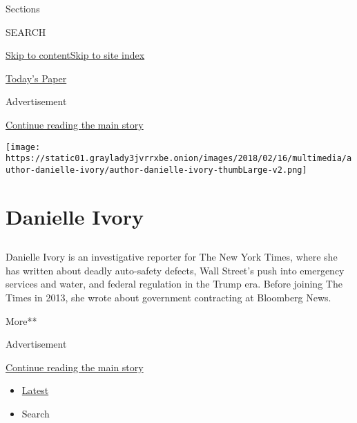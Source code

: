 Sections

SEARCH

\protect\hyperlink{site-content}{Skip to
content}\protect\hyperlink{site-index}{Skip to site index}

\href{https://myaccount.nytimes3xbfgragh.onion/auth/login?response_type=cookie\&client_id=vi}{}

\href{https://www.nytimes3xbfgragh.onion/section/todayspaper}{Today's
Paper}

Advertisement

\protect\hyperlink{after-top}{Continue reading the main story}

\texttt{[image: https://static01.graylady3jvrrxbe.onion/images/2018/02/16/multimedia/author-danielle-ivory/author-danielle-ivory-thumbLarge-v2.png]}

\hypertarget{danielle-ivory}{%
\section{Danielle Ivory}\label{danielle-ivory}}

\subsection{}

Danielle Ivory is an investigative reporter for The New York Times,
where she has written about deadly auto-safety defects, Wall Street's
push into emergency services and water, and federal regulation in the
Trump era. Before joining The Times in 2013, she wrote about government
contracting at Bloomberg News.

More**

Advertisement

\protect\hyperlink{after-mid1}{Continue reading the main story}

\begin{itemize}
\tightlist
\item
  \protect\hyperlink{stream-panel}{Latest}
\item
  Search
\end{itemize}

